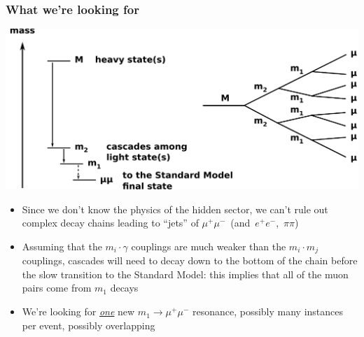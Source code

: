 \documentclass[compress]{beamer}
\begin{document}
\begin{frame}
\frametitle{What we're looking for}

\begin{center}
\includegraphics[width=0.8\linewidth]{basic_picture4.pdf}
\end{center}

\begin{itemize}
\item Since we don't know the physics of the hidden sector, we can't
  rule out complex decay chains leading to ``jets'' of \mbox{$\mu^+\mu^-$ (and
  $e^+e^-$, $\pi\pi$)\hspace{-0.5 cm}}
\item Assuming that the $m_i \cdot \gamma$ couplings are much weaker
  than the $m_i \cdot m_j$ couplings, cascades will need to decay down
  to the bottom of the chain before the slow transition to the
  Standard Model: this implies that all of the muon pairs come from
  $m_1$ decays
\item We're looking for \underline{\it one} new $m_1 \to \mu^+\mu^-$ resonance,
  possibly many instances per event, possibly overlapping
\end{itemize}
\end{frame}
\end{document}
